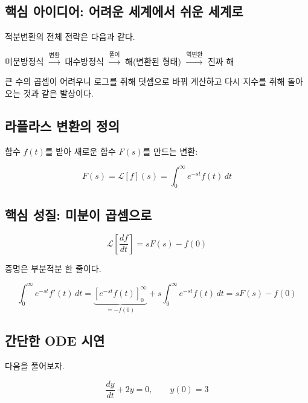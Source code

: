 \documentclass[11pt,a4paper]{article}
\begin{document}
\subsection{핵심 아이디어: 어려운 세계에서 쉬운 세계로}

적분변환의 전체 전략은 다음과 같다.

\begin{center}
미분방정식 $\xrightarrow{\text{변환}}$ 대수방정식 $\xrightarrow{\text{풀이}}$ 해(변환된 형태) $\xrightarrow{\text{역변환}}$ 진짜 해
\end{center}

큰 수의 곱셈이 어려우니 로그를 취해 덧셈으로 바꿔 계산하고 다시 지수를 취해 돌아오는 것과 같은 발상이다.

\subsection{라플라스 변환의 정의}

함수 $f(t)$를 받아 새로운 함수 $F(s)$를 만드는 변환:

\begin{equation}
F(s) = \mathcal{L}[f](s) = \int_0^\infty e^{-st} f(t)\, dt
\label{eq:laplace}
\end{equation}

\subsection{핵심 성질: 미분이 곱셈으로}

\begin{equation}
\mathcal{L}\!\left[\frac{df}{dt}\right] = sF(s) - f(0)
\end{equation}

증명은 부분적분 한 줄이다.

\begin{equation}
\int_0^\infty e^{-st} f'(t)\, dt = \underbrace{[e^{-st}f(t)]_0^\infty}_{= -f(0)} + s\int_0^\infty e^{-st} f(t)\, dt = sF(s) - f(0)
\end{equation}

\subsection{간단한 ODE 시연}

다음을 풀어보자.

\begin{equation}
\frac{dy}{dt} + 2y = 0, \qquad y(0) = 3
\end{equation}
\end{document}
